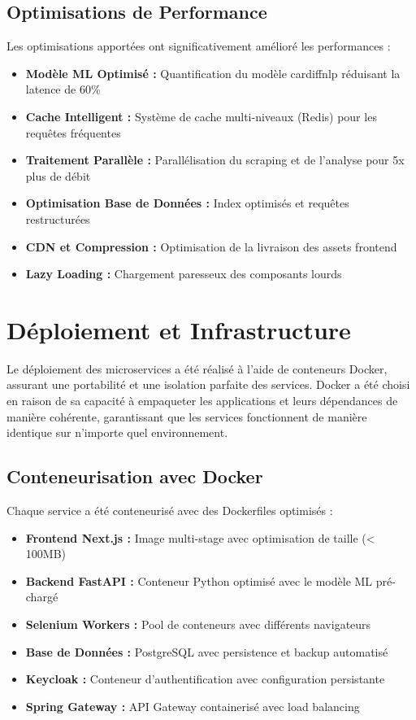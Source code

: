 \subsection{Optimisations de Performance}

Les optimisations apportées ont significativement amélioré les performances :

\begin{itemize}
    \item \textbf{Modèle ML Optimisé :} Quantification du modèle cardiffnlp réduisant la latence de 60\%
    \item \textbf{Cache Intelligent :} Système de cache multi-niveaux (Redis) pour les requêtes fréquentes
    \item \textbf{Traitement Parallèle :} Parallélisation du scraping et de l'analyse pour 5x plus de débit
    \item \textbf{Optimisation Base de Données :} Index optimisés et requêtes restructurées
    \item \textbf{CDN et Compression :} Optimisation de la livraison des assets frontend
    \item \textbf{Lazy Loading :} Chargement paresseux des composants lourds
\end{itemize}

\section{Déploiement et Infrastructure}

Le déploiement des microservices a été réalisé à l'aide de conteneurs Docker, assurant une portabilité et une isolation parfaite des services. Docker a été choisi en raison de sa capacité à empaqueter les applications et leurs dépendances de manière cohérente, garantissant que les services fonctionnent de manière identique sur n'importe quel environnement.

\subsection{Conteneurisation avec Docker}

Chaque service a été conteneurisé avec des Dockerfiles optimisés :

\begin{itemize}
    \item \textbf{Frontend Next.js :} Image multi-stage avec optimisation de taille (< 100MB)
    \item \textbf{Backend FastAPI :} Conteneur Python optimisé avec le modèle ML pré-chargé
    \item \textbf{Selenium Workers :} Pool de conteneurs avec différents navigateurs
    \item \textbf{Base de Données :} PostgreSQL avec persistence et backup automatisé
    \item \textbf{Keycloak :} Conteneur d'authentification avec configuration persistante
    \item \textbf{Spring Gateway :} API Gateway containerisé avec load balancing
\end{itemize}

